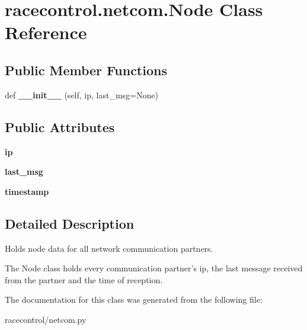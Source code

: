 \section{racecontrol.\+netcom.\+Node Class Reference}
\label{classracecontrol_1_1netcom_1_1Node}
\subsection*{Public Member Functions}
\begin{DoxyCompactItemize}
\item 
def {\bfseries \+\_\+\+\_\+init\+\_\+\+\_\+} (self, ip, last\+\_\+msg=None)\label{classracecontrol_1_1netcom_1_1Node_ab4657c078f6072dd8c969deb02fc38b4}

\end{DoxyCompactItemize}
\subsection*{Public Attributes}
\begin{DoxyCompactItemize}
\item 
{\bfseries ip}\label{classracecontrol_1_1netcom_1_1Node_abdff7afa445316fee0d5654d7afb1807}

\item 
{\bfseries last\+\_\+msg}\label{classracecontrol_1_1netcom_1_1Node_a94713033f5b908feedd0c8916983e3b5}

\item 
{\bfseries timestamp}\label{classracecontrol_1_1netcom_1_1Node_a5c936ec6a989b43b28b349adbca9225e}

\end{DoxyCompactItemize}


\subsection{Detailed Description}
\begin{DoxyVerb}Holds node data for all network communication partners.

The Node class holds every communication partner's ip, the last message
received from the partner and the time of reception.
\end{DoxyVerb}
 

The documentation for this class was generated from the following file\+:\begin{DoxyCompactItemize}
\item 
racecontrol/netcom.\+py\end{DoxyCompactItemize}
